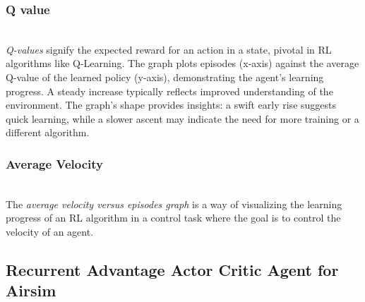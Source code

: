 \documentclass[preprint,12pt]{elsarticle}
\begin{document}
\subsubsection{Q value}\\
\textit{Q-values} signify the expected reward for an action in a state, pivotal in RL algorithms like Q-Learning. The graph plots episodes (x-axis) against the average Q-value of the learned policy (y-axis), demonstrating the agent's learning progress. A steady increase typically reflects improved understanding of the environment. The graph's shape provides insights: a swift early rise suggests quick learning, while a slower ascent may indicate the need for more training or a different algorithm.

\subsubsection{Average Velocity}\\
The \textit{average velocity versus episodes graph} is a way of visualizing the learning progress of an RL algorithm in a control task where the goal is to control the velocity of an agent. \\

\subsection{Recurrent Advantage Actor Critic Agent for Airsim }\\
\end{document}
